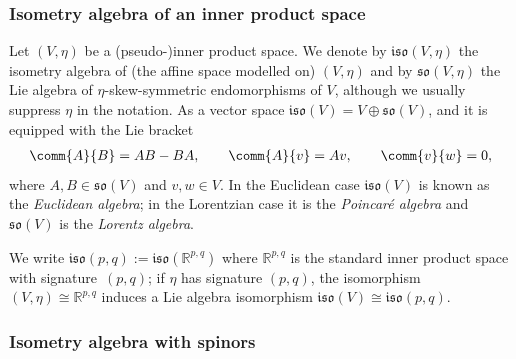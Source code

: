 \documentclass[10pt,a4paper]{amsart}
\numberwithin{equation}{section}
\newcommand{\fso}{\mathfrak{so}}
\newcommand{\fiso}{\mathfrak{iso}}
\newcommand{\RR}{\mathbb{R}}
\newcommand{\1}{\mathbbm{1}}
\begin{document}
\subsubsection{Isometry algebra of an inner product space}

Let $(V,\eta)$ be a (pseudo-)inner product space. We denote by $\fiso(V,\eta)$ the isometry algebra of (the affine space modelled on) $(V,\eta)$ and by $\fso(V,\eta)$ the Lie algebra of $\eta$-skew-symmetric endomorphisms of $V$, although we usually suppress $\eta$ in the notation. As a vector space $\fiso(V)=V\oplus\fso(V)$, and it is equipped with the Lie bracket
\begin{align}\label{eq:flat-bracket}
 \comm{A}{B} = AB - BA,\qquad
 \comm{A}{v} = Av,\qquad
\comm{v}{w} = 0,
\end{align}
where $A,B\in\fso(V)$ and $v,w\in V$. In the Euclidean case $\fiso(V)$ is known as the \emph{Euclidean algebra}; in the Lorentzian case it is the \emph{Poincar\'e algebra} and $\fso(V)$ is the \emph{Lorentz algebra}.

We write $\fiso(p,q):=\fiso(\RR^{p,q})$ where $\RR^{p,q}$ is the standard inner product space with signature~$(p,q)$; if $\eta$ has signature $(p,q)$, the isomorphism $(V,\eta)\cong\RR^{p,q}$ induces a Lie algebra isomorphism $\fiso(V)\cong\fiso(p,q)$.

\subsubsection{Isometry algebra with spinors}
\label{sec:isom-alg-spinors}
\end{document}
